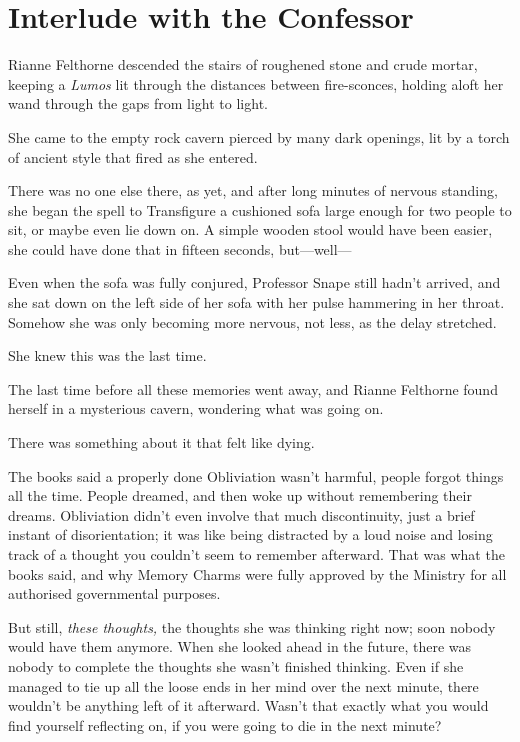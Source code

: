 \chapter{Interlude with the Confessor}

Rianne Felthorne descended the stairs of roughened stone and crude
mortar, keeping a \emph{Lumos} lit through the distances between
fire-sconces, holding aloft her wand through the gaps from light to
light.

She came to the empty rock cavern pierced by many dark openings, lit by
a torch of ancient style that fired as she entered.

There was no one else there, as yet, and after long minutes of nervous
standing, she began the spell to Transfigure a cushioned sofa large
enough for two people to sit, or maybe even lie down on. A simple wooden
stool would have been easier, she could have done that in fifteen
seconds, but---well---

Even when the sofa was fully conjured, Professor Snape still hadn't
arrived, and she sat down on the left side of her sofa with her pulse
hammering in her throat. Somehow she was only becoming more nervous, not
less, as the delay stretched.

She knew this was the last time.

The last time before all these memories went away, and Rianne Felthorne
found herself in a mysterious cavern, wondering what was going on.

There was something about it that felt like dying.

The books said a properly done Obliviation wasn't harmful, people forgot
things all the time. People dreamed, and then woke up without
remembering their dreams. Obliviation didn't even involve that much
discontinuity, just a brief instant of disorientation; it was like being
distracted by a loud noise and losing track of a thought you couldn't
seem to remember afterward. That was what the books said, and why Memory
Charms were fully approved by the Ministry for all authorised
governmental purposes.

But still, \emph{these thoughts,} the thoughts she was thinking right
now; soon nobody would have them anymore. When she looked ahead in the
future, there was nobody to complete the thoughts she wasn't finished
thinking. Even if she managed to tie up all the loose ends in her mind
over the next minute, there wouldn't be anything left of it afterward.
Wasn't that exactly what you would find yourself reflecting on, if you
were going to die in the next minute?


